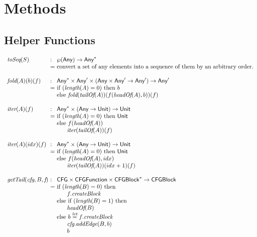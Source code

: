 \section{Methods}
\subsection{Helper Functions}
\[
\begin{array}{l@{}l@{~}l}
\toSeq(S) & : & \powerset{\Any} \rightarrow \Any^{*}\\
& = & \text{convert a set of any elements into a sequence of them by an arbitrary order.}\\
& & \\

\fold(A)(b)(f) & : & \Any^{*} \times \Any' \times (\Any \times \Any' \rightarrow \Any') \rightarrow \Any'\\
& = & \mbox{if}\ (\length(A) = 0)\ \mbox{then}\ b \\
& & \mbox{else}\ \fold(\tailOf(A))(f(\headOf(A),b))(f)\\
& & \\

\iter(A)(f) & : & \Any^{*} \times (\Any \rightarrow \Unit) \rightarrow \Unit\\
& = & \mbox{if}\ (\length(A) = 0)\ \mbox{then}\ \Unit \\
& & \mbox{else}\ f(\headOf(A))\\
& & \phantom{else} \iter(\tailOf(A))(f)\\
& & \\

\iter(A)(idx)(f) & : & \Any^{*} \times (\Any \rightarrow \Unit) \rightarrow \Unit\\
& = & \mbox{if}\ (\length(A) = 0)\ \mbox{then}\ \Unit \\
& & \mbox{else}\ f(\headOf(A), idx)\\
& & \phantom{else} \iter(\tailOf(A))(idx+1)(f)\\
& & \\

\getTail(\emph{cfg}, B, \emph{f})\ & : & \CFG \times \CFGFunction \times \CFGBlock^{*} \rightarrow \CFGBlock \\
& = & \mbox{if}\ (\length(B) = 0)\ \mbox{then}\\
& & \phantom{else} f.\emph{createBlock}\\
& & \mbox{else}\ \mbox{if}\ (\length(B) = 1)\ \mbox{then}\\
& & \phantom{else} \headOf(B) \\
& & \mbox{else}\ b \letval f.\emph{createBlock}\\
& & \phantom{else} \emph{cfg}.\emph{addEdge}(B, b)\\
& & \phantom{else} b\\
\end{array}
\]

